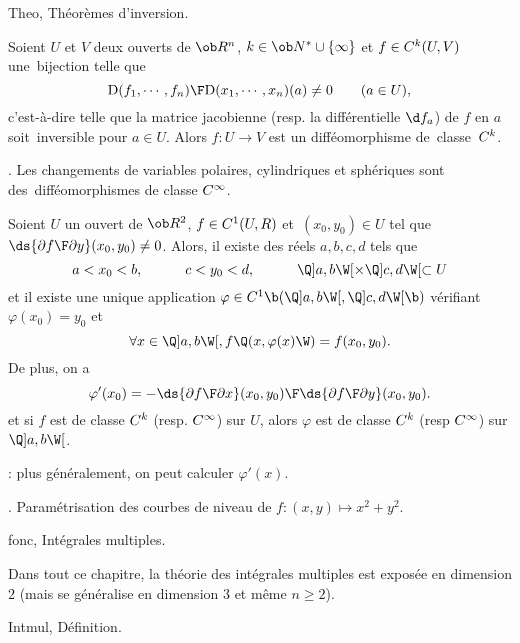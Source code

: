 \Section Theo, Théorèmes d'inversion. 

\Theoreme []  Soient $U$ et $V$ deux ouverts de $\ob R^n$, $k\in\ob N^*\cup\{\infty\}$ et $f\in\sc C^k(U,V)$ une~bijection 
telle que 
$$
{\mbox{D}(f_1,\cdots,f_n)\F\mbox{D}(x_1,\cdots,x_n)}(a)\neq 0\qquad(a\in U),
$$ 
c'est-à-dire telle que la matrice jacobienne (resp. la différentielle $\d f_a$) de $f$ en $a$ 
soit~inversible pour $a\in U$. 
Alors $f:U\to V$ est un difféo\-mor\-phi\-sme de~classe~$\sc C^k$. 
\bigskip

\Exemple.  Les changements de variables polaires, cylindriques et sphériques 
sont des~difféo\-mor\-phi\-smes de classe $\sc C^\infty$. 
\bigskip

 Soient $U$ un ouvert de $\ob R^2$, 
$f\in\sc C^1(U,R)$ et~$(x_0,y_0)\in U$ tel que $\ds {\partial f\F\partial y}(x_0,y_0)\neq 0$. 
Alors, il existe des réels $a,b,c,d$ tels que 
$$
a<x_0<b,\qquad\quad c<y_0<d, \qquad\quad \Q]a,b\W[\times\Q]c,d\W[\subset U
$$ 
et il existe une unique application $\varphi\in\sc C^1\b(\Q]a,b\W[,\Q]c,d\W[\b)$ vérifiant 
$\varphi(x_0)=y_0$ et 
$$
\forall x\in\Q]a,b\W[, f\Q(x,\varphi(x)\W)=f(x_0,y_0).
$$ 
De plus, on a 
$$
\varphi'(x_0)=-{\ds{\partial f\F\partial x}(x_0,y_0)\F\ds {\partial f\F\partial y}(x_0,y_0)}. 
$$
et si $f$ est de classe $\sc C^k$ (resp. $\sc C^\infty$) sur $U$, 
alors $\varphi$ est de classe $\sc C^k$ (resp $\sc C^\infty$) sur $\Q]a,b\W[$. 
\bigskip

\Remarque : plus généralement, on peut calculer $\varphi'(x)$. 
\bigskip

\Exemple.  Paramétrisation des courbes de niveau de $f:(x,y)\mapsto x^2+y^2$. 






\pagetitretrue


\Chapter fonc, Intégrales multiples. 
\bigskip

Dans tout ce chapitre, la théorie des intégrales multiples est exposée en dimension $2$ (mais se généralise en dimension $3$ et même $n\ge2$). 
\bigskip

\Section Intmul, Définition. 

